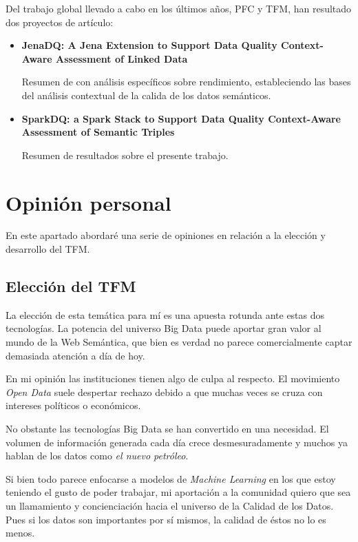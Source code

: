 Del trabajo global llevado a cabo en los últimos años, \acs{PFC} y \acs{TFM},
han resultado dos proyectos de artículo: 

\begin{itemize}
\item \textbf{JenaDQ: A Jena Extension to Support Data Quality Context-Aware Assessment
  of Linked Data}

Resumen de \cite{PFC} con análisis específicos sobre rendimiento, estableciendo
las bases del análisis contextual de la calida de los datos semánticos. 

\item \textbf{SparkDQ: a Spark Stack to Support Data Quality Context-Aware
  Assessment of Semantic Triples}

Resumen de resultados sobre el presente trabajo. 
\end{itemize}


\section{Opinión personal}
En este apartado abordaré una serie de opiniones en relación a la elección y
desarrollo del \acs{TFM}.

\subsection{Elección del \acs{TFM}}

La elección de esta temática para mí es una apuesta rotunda ante estas dos
tecnologías. La potencia del universo Big Data puede aportar gran valor al mundo
de la Web Semántica, que bien es verdad no parece comercialmente captar
demasiada atención a día de hoy.

En mi opinión las instituciones tienen algo de culpa al respecto. El movimiento
\textit{Open Data} suele despertar rechazo debido a que muchas veces se cruza
con intereses políticos o económicos. 

No obstante las tecnologías Big Data se han convertido en una necesidad. El
volumen de información generada cada día crece desmesuradamente y muchos ya
hablan de los datos como \textit{el nuevo petróleo}. 

Si bien todo parece enfocarse a modelos de \textit{Machine Learning} en los que
estoy teniendo el gusto de poder trabajar, mi aportación a la comunidad quiero
que sea un llamamiento y concienciación hacia el universo de la Calidad de los
Datos. Pues si los datos son importantes por sí mismos, la calidad de éstos no
lo es menos. 

